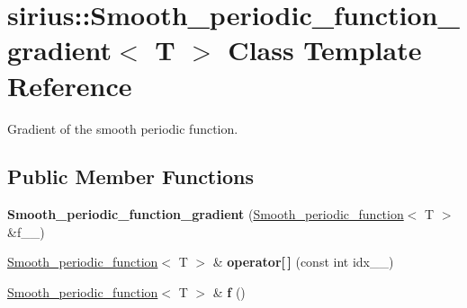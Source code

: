 \hypertarget{classsirius_1_1_smooth__periodic__function__gradient}{}\section{sirius\+:\+:Smooth\+\_\+periodic\+\_\+function\+\_\+gradient$<$ T $>$ Class Template Reference}
\label{classsirius_1_1_smooth__periodic__function__gradient}


Gradient of the smooth periodic function.  


\subsection*{Public Member Functions}
\begin{DoxyCompactItemize}
\item 
\hypertarget{classsirius_1_1_smooth__periodic__function__gradient_acb49116c85c7bc2392d719e49ebe8f22}{}{\bfseries Smooth\+\_\+periodic\+\_\+function\+\_\+gradient} (\hyperlink{classsirius_1_1_smooth__periodic__function}{Smooth\+\_\+periodic\+\_\+function}$<$ T $>$ \&f\+\_\+\+\_\+)\label{classsirius_1_1_smooth__periodic__function__gradient_acb49116c85c7bc2392d719e49ebe8f22}

\item 
\hypertarget{classsirius_1_1_smooth__periodic__function__gradient_ae1e91fda648cf18820cb5c6ae8ec9eaf}{}\hyperlink{classsirius_1_1_smooth__periodic__function}{Smooth\+\_\+periodic\+\_\+function}$<$ T $>$ \& {\bfseries operator\mbox{[}$\,$\mbox{]}} (const int idx\+\_\+\+\_\+)\label{classsirius_1_1_smooth__periodic__function__gradient_ae1e91fda648cf18820cb5c6ae8ec9eaf}

\item 
\hypertarget{classsirius_1_1_smooth__periodic__function__gradient_aef2f0d924da08bad7aea94cee25791e5}{}\hyperlink{classsirius_1_1_smooth__periodic__function}{Smooth\+\_\+periodic\+\_\+function}$<$ T $>$ \& {\bfseries f} ()\label{classsirius_1_1_smooth__periodic__function__gradient_aef2f0d924da08bad7aea94cee25791e5}

\end{DoxyCompactItemize}
